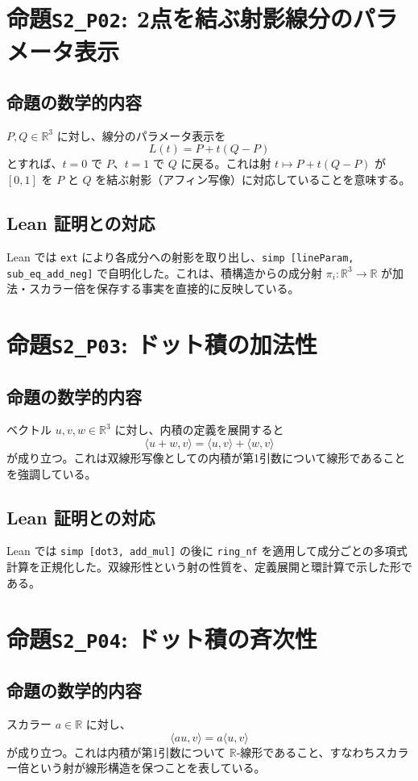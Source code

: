 \documentclass{ltjsarticle}
\begin{document}
\section{命題\texttt{S2\_P02}: 2点を結ぶ射影線分のパラメータ表示}
\subsection{命題の数学的内容}
$P, Q \in \mathbb{R}^3$ に対し、線分のパラメータ表示を
\[
L(t) = P + t(Q - P)
\]
とすれば、$t=0$ で $P$、$t=1$ で $Q$ に戻る。これは射 $t \mapsto P + t(Q-P)$ が $[0,1]$ を $P$ と $Q$ を結ぶ射影（アフィン写像）に対応していることを意味する。

\subsection{Lean 証明との対応}
Lean では \verb|ext| により各成分への射影を取り出し、\verb|simp [lineParam, sub_eq_add_neg]| で自明化した。これは、積構造からの成分射 $\pi_i : \mathbb{R}^3 \to \mathbb{R}$ が加法・スカラー倍を保存する事実を直接的に反映している。

\section{命題\texttt{S2\_P03}: ドット積の加法性}
\subsection{命題の数学的内容}
ベクトル $u, v, w \in \mathbb{R}^3$ に対し、内積の定義を展開すると
\[
\langle u + w, v \rangle = \langle u, v \rangle + \langle w, v \rangle
\]
が成り立つ。これは双線形写像としての内積が第1引数について線形であることを強調している。

\subsection{Lean 証明との対応}
Lean では \verb|simp [dot3, add_mul]| の後に \verb|ring_nf| を適用して成分ごとの多項式計算を正規化した。双線形性という射の性質を、定義展開と環計算で示した形である。

\section{命題\texttt{S2\_P04}: ドット積の斉次性}
\subsection{命題の数学的内容}
スカラー $a \in \mathbb{R}$ に対し、
\[
\langle a u, v \rangle = a \langle u, v \rangle
\]
が成り立つ。これは内積が第1引数について $\mathbb{R}$-線形であること、すなわちスカラー倍という射が線形構造を保つことを表している。
\end{document}
